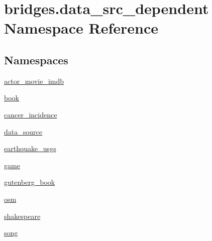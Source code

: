 \hypertarget{namespacebridges_1_1data__src__dependent}{}\section{bridges.\+data\+\_\+src\+\_\+dependent Namespace Reference}
\label{namespacebridges_1_1data__src__dependent}
\subsection*{Namespaces}
\begin{DoxyCompactItemize}
\item 
 \mbox{\hyperlink{namespacebridges_1_1data__src__dependent_1_1actor__movie__imdb}{actor\+\_\+movie\+\_\+imdb}}
\item 
 \mbox{\hyperlink{namespacebridges_1_1data__src__dependent_1_1book}{book}}
\item 
 \mbox{\hyperlink{namespacebridges_1_1data__src__dependent_1_1cancer__incidence}{cancer\+\_\+incidence}}
\item 
 \mbox{\hyperlink{namespacebridges_1_1data__src__dependent_1_1data__source}{data\+\_\+source}}
\item 
 \mbox{\hyperlink{namespacebridges_1_1data__src__dependent_1_1earthquake__usgs}{earthquake\+\_\+usgs}}
\item 
 \mbox{\hyperlink{namespacebridges_1_1data__src__dependent_1_1game}{game}}
\item 
 \mbox{\hyperlink{namespacebridges_1_1data__src__dependent_1_1gutenberg__book}{gutenberg\+\_\+book}}
\item 
 \mbox{\hyperlink{namespacebridges_1_1data__src__dependent_1_1osm}{osm}}
\item 
 \mbox{\hyperlink{namespacebridges_1_1data__src__dependent_1_1shakespeare}{shakespeare}}
\item 
 \mbox{\hyperlink{namespacebridges_1_1data__src__dependent_1_1song}{song}}
\end{DoxyCompactItemize}

